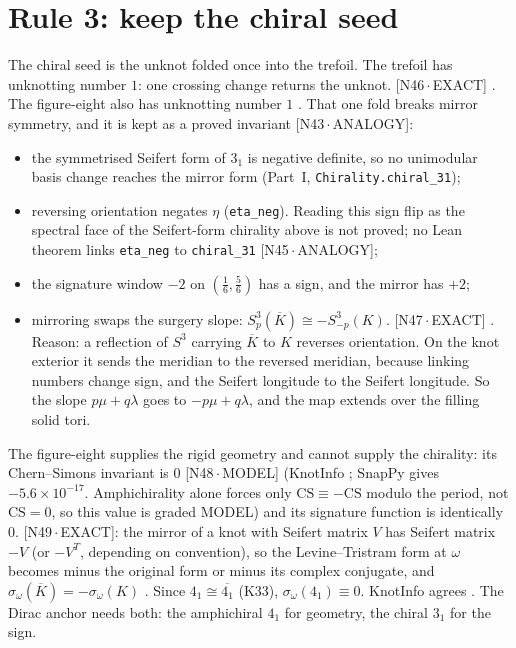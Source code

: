 \documentclass[11pt]{article}
\theoremstyle{definition}
\newcommand{\lean}[1]{\texttt{\small #1}}
\newcommand{\dtag}[1]{#1}
\begin{document}
\section{Rule 3: keep the chiral seed}\label{sec:rule3}
The chiral seed is the unknot folded once into the trefoil. The trefoil has unknotting number $1$: one crossing change returns the unknot.\dtag{ \textsf{\small[N46\,$\cdot$\,EXACT]} \cite{KnotInfo}. The figure-eight also has unknotting number $1$ \cite{KnotInfo}.} That one fold breaks mirror symmetry, and it is kept as a proved invariant \dtag{\textsf{\small[N43\,$\cdot$\,ANALOGY]}}:
\begin{itemize}[leftmargin=2em]
\item the symmetrised Seifert form of $3_1$ is negative definite, so no unimodular basis change reaches the mirror form (Part~I, \lean{Chirality.chiral\_31});
\item reversing orientation negates $\eta$ (\lean{eta\_neg}). Reading this sign flip as the spectral face of the Seifert-form chirality above is not proved; no Lean theorem links \lean{eta\_neg} to \lean{chiral\_31} \dtag{\textsf{\small[N45\,$\cdot$\,ANALOGY]}};
\item the signature window $-2$ on $(\tfrac16,\tfrac56)$ has a sign, and the mirror has $+2$;
\item mirroring swaps the surgery slope: $S^3_p(\overline K)\cong-S^3_{-p}(K)$.\dtag{ \textsf{\small[N47\,$\cdot$\,EXACT]} \cite[\S1]{StipsiczSzabo}. Reason: a reflection of $S^3$ carrying $\overline K$ to $K$ reverses orientation. On the knot exterior it sends the meridian to the reversed meridian, because linking numbers change sign, and the Seifert longitude to the Seifert longitude. So the slope $p\mu+q\lambda$ goes to $-p\mu+q\lambda$, and the map extends over the filling solid tori.}
\end{itemize}
The figure-eight supplies the rigid geometry and cannot supply the chirality: its Chern--Simons invariant is $0$\dtag{ \textsf{\small[N48\,$\cdot$\,MODEL]} (KnotInfo \cite{KnotInfo}; SnapPy \cite{SnapPy} gives $-5.6\times10^{-17}$. Amphichirality alone forces only $\mathrm{CS}\equiv-\mathrm{CS}$ modulo the period, not $\mathrm{CS}=0$, so this value is graded MODEL)} and its signature function is identically $0$.\dtag{ \textsf{\small[N49\,$\cdot$\,EXACT]}: the mirror of a knot with Seifert matrix $V$ has Seifert matrix $-V$ (or $-V^{T}$, depending on convention), so the Levine--Tristram form at $\omega$ becomes minus the original form or minus its complex conjugate, and $\sigma_\omega(\overline K)=-\sigma_\omega(K)$ \cite{Levine,Tristram}. Since $4_1\cong\overline{4_1}$ (K33), $\sigma_\omega(4_1)\equiv0$. KnotInfo agrees \cite{KnotInfo}.} The Dirac anchor needs both: the amphichiral $4_1$ for geometry, the chiral $3_1$ for the sign.
\end{document}
